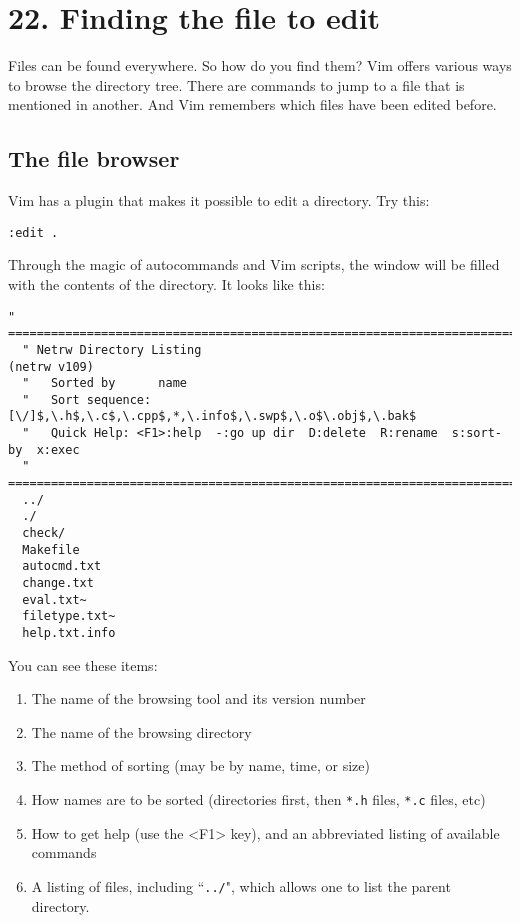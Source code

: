 \section{22. Finding the file to edit}
Files can be found everywhere.  So how do you find them?  Vim offers various
ways to browse the directory tree.  There are commands to jump to a file that
is mentioned in another.  And Vim remembers which files have been edited
before.
\localtableofcontents
\subsection{The file browser}

Vim has a plugin that makes it possible to edit a directory.  Try this:

\begin{Verbatim}[samepage=true]
 :edit .
\end{Verbatim}

Through the magic of autocommands and Vim scripts, the window will be filled with the contents of the directory.
It looks like this:

\begin{Verbatim}[samepage=true]
  " ============================================================================ 
  " Netrw Directory Listing                                        (netrw v109) 
  "   Sorted by      name 
  "   Sort sequence: [\/]$,\.h$,\.c$,\.cpp$,*,\.info$,\.swp$,\.o$\.obj$,\.bak$ 
  "   Quick Help: <F1>:help  -:go up dir  D:delete  R:rename  s:sort-by  x:exec 
  " ============================================================================ 
  ../ 
  ./ 
  check/ 
  Makefile 
  autocmd.txt 
  change.txt 
  eval.txt~ 
  filetype.txt~ 
  help.txt.info 
\end{Verbatim}

You can see these items:

\begin{enumerate}
\item The name of the browsing tool and its version number
\item The name of the browsing directory
\item The method of sorting (may be by name, time, or size)
\item How names are to be sorted (directories first, then \texttt{*.h} files, \texttt{*.c} files, etc)
\item How to get help (use the <F1> key), and an abbreviated listing of available commands
\item A listing of files, including ``\texttt{../}", which allows one to list the parent directory.
\end{enumerate}

